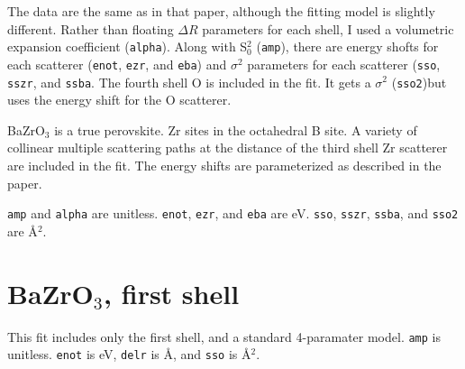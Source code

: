 \documentclass{article}
\let\stdsection\section
\renewcommand\section{\newpage\stdsection}
\begin{document}
The data are the same as in that paper, although the fitting model is
slightly different.  Rather than floating $\Delta R$ parameters for
each shell, I used a volumetric expansion coefficient
(\texttt{alpha}).  Along with S$_0^2$ (\texttt{amp}), there are energy
shofts for each scatterer (\texttt{enot}, \texttt{ezr}, and
\texttt{eba}) and $\sigma^2$ parameters for each scatterer
(\texttt{sso}, \texttt{sszr}, and \texttt{ssba}.  The fourth shell O
is included in the fit.  It gets a $\sigma^2$ (\texttt{sso2})but uses
the energy shift for the O scatterer.

BaZrO$_3$ is a true perovskite.  Zr sites in the octahedral B site.  A
variety of collinear multiple scattering paths at the distance of the
third shell Zr scatterer are included in the fit.  The energy shifts
are parameterized as described in the paper.

\texttt{amp} and \texttt{alpha} are unitless.  \texttt{enot},
\texttt{ezr}, and \texttt{eba} are eV.  \texttt{sso}, \texttt{sszr},
\texttt{ssba}, and \texttt{sso2} are \AA$^2$.


\def\feffmaterial{BaZrO3}
\def\feffrone{3}
\def\feffrtwo{4}
\def\feffrthree{5}
\def\feffrfour{5.5}
\def\feffrfive{6}
\def\fefffirst{}

\scriptsize

\fitplots


\section{BaZrO$_3$, first shell}
\normalsize
This fit includes only the first shell, and a standard 4-paramater
model.  \texttt{amp} is unitless.  \texttt{enot} is eV, \texttt{delr}
is \AA, and \texttt{sso} is \AA$^2$.

\def\fefffirst{_1st}

\small

\fitplots




% 

\end{document}
